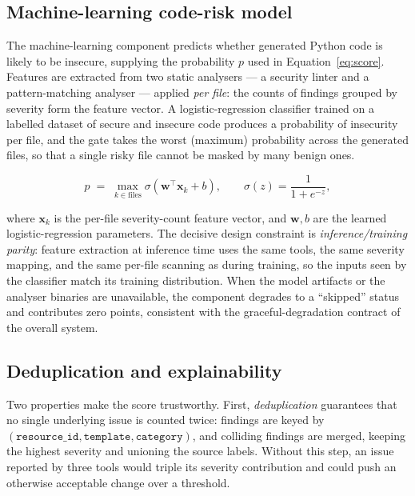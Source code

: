\subsection{Machine-learning code-risk model}
\label{subsec:rs-ml}

The machine-learning component predicts whether generated Python code is likely to be
insecure, supplying the probability $p$ used in Equation~\ref{eq:score}. Features are
extracted from two static analysers --- a security linter and a pattern-matching analyser
--- applied \emph{per file}: the counts of findings grouped by severity form the feature
vector. A logistic-regression classifier trained on a labelled dataset of secure and
insecure code produces a probability of insecurity per file, and the gate takes the worst
(maximum) probability across the generated files, so that a single risky file cannot be
masked by many benign ones.

\begin{equation}
\label{eq:ml}
p \;=\; \max_{k \in \text{files}} \sigma\!\left(\mathbf{w}^{\top}\mathbf{x}_k + b\right),
\qquad
\sigma(z) = \frac{1}{1 + e^{-z}},
\end{equation}

where $\mathbf{x}_k$ is the per-file severity-count feature vector, and $\mathbf{w}, b$
are the learned logistic-regression parameters. The decisive design constraint is
\emph{inference/training parity}: feature extraction at inference time uses the same
tools, the same severity mapping, and the same per-file scanning as during training, so
the inputs seen by the classifier match its training distribution. When the model
artifacts or the analyser binaries are unavailable, the component degrades to a
``skipped'' status and contributes zero points, consistent with the graceful-degradation
contract of the overall system.

\subsection{Deduplication and explainability}
\label{subsec:rs-explain}

Two properties make the score trustworthy. First, \emph{deduplication} guarantees that no
single underlying issue is counted twice: findings are keyed by
$(\texttt{resource\_id}, \texttt{template}, \texttt{category})$, and colliding findings
are merged, keeping the highest severity and unioning the source labels. Without this
step, an issue reported by three tools would triple its severity contribution and could
push an otherwise acceptable change over a threshold.


